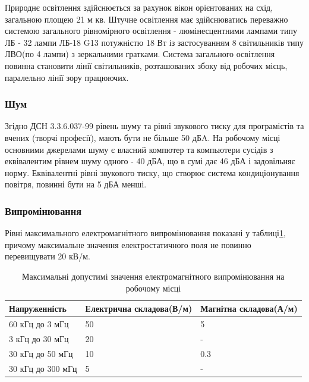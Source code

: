    Природнє освітлення здійснюється за рахунок вікон орієнтованих на схід, загальною площею 21 м кв.
    Штучне освітлення має здійснюватись переважно системою загального рівномірного освітлення -  люмінесцентними лампами типу ЛБ - 32 лампи
    ЛБ-18 G13 потужністю 18 Вт із застосуванням 8 світильників типу ЛВО(по 4 лампи) з зеркальними гратками.
    Система загального освітлення повинна становити лінії світильників, розташованих збоку від робочих місць, паралельно лінії зору працюючих.

    \subsubsection{Шум}
        Згідно ДСН 3.3.6.037-99\cite{lab-dsn37} рівень шуму та рівні звукового тиску для програмістів та вчених (творчі професії), мають бути не більше 50 дБA. 
        На робочому місці основними джерелами шуму є власний компютер та компьютери сусідів з еквівалентим рівнем шуму одного - 40 дБА, що в сумі дає 46 дБА
        і задовільняє норму.
        Еквівалентні рівні звукового тиску, що створює система кондиціонування повітря, повинні бути на 5 дБА менші.
    \subsubsection{Випромінювання}
    Рівні максимального електромагнітного випромінювання показані у таблиці\ref{tab:lab-waves}, причому максимальне значення
    електростатичного поля не повинно перевищувати 20 кВ/м.

    \begin{table}[h]
        \caption{Максимальні допустимі значення електромагнітного випромінювання на робочому місці}
        \begin{tabularx}{\textwidth}{| X | X | X |}
            \hline
            Напруженність & Електрична складова(В/м) & Магнітна складова(А/м) \\ \hline
            60 кГц до 3 мГц     & 50                       & 5                      \\ \hline
            3 кГц до 30 мГц     & 20                       & -                      \\ \hline
            30 кГц до 50 мГц    & 10                       & 0.3                    \\ \hline
            30 кГц до 300 мГц   & 5                        & -                      \\ \hline
        \end{tabularx}
        \label{tab:lab-waves}
    \end{table}

